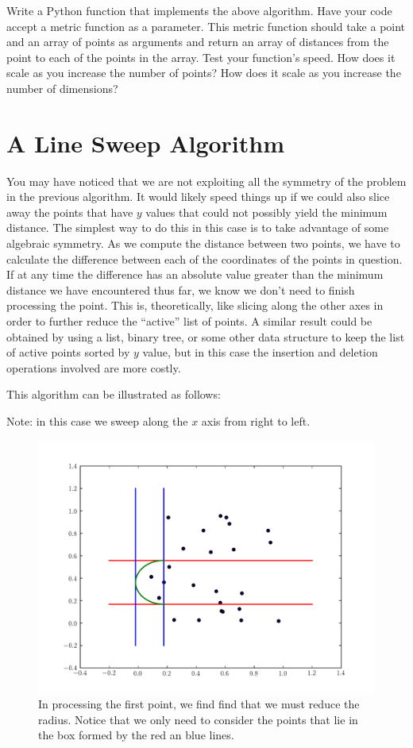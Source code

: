 \begin{problem}
Write a Python function that implements the above algorithm.
Have your code accept a metric function as a parameter.
This metric function should take a point and an array of points as arguments and return an array of distances from the point to each of the points in the array. 
Test your function's speed. 
How does it scale as you increase the number of points? 
How does it scale as you increase the number of dimensions?
\end{problem}

\section*{A Line Sweep Algorithm}

You may have noticed that we are not exploiting all the symmetry of the problem in the previous algorithm. 
It would likely speed things up if we could also slice away the points that have $y$ values that could not possibly yield the minimum distance. 
The simplest way to do this in this case is to take advantage of some algebraic symmetry.
As we compute the distance between two points, we have to calculate the difference between each of the coordinates of the points in question. 
If at any time the difference has an absolute value greater than the minimum distance we have encountered thus far, we know we don't need to finish processing the point.
This is, theoretically, like slicing along the other axes in order to further reduce the ``active'' list of points.
A similar result could be obtained by using a list, binary tree, or some other data structure to keep the list of active points sorted by $y$ value, but in this case the insertion and deletion operations involved are more costly.

This algorithm can be illustrated as follows:

Note: in this case we sweep along the $x$ axis from right to left.

\begin{figure}[H]
\includegraphics[width = .8\textwidth]{sweep0.pdf}
\caption{In processing the first point, we find find that we must reduce the radius.
Notice that we only need to consider the points that lie in the box formed by the red an blue lines.}
\end{figure}

